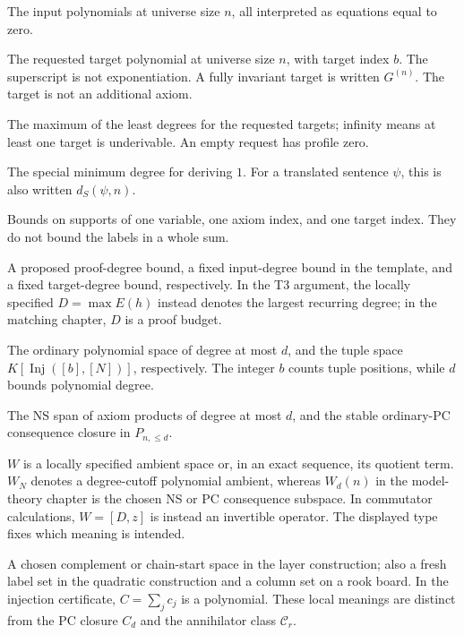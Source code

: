 \documentclass[11pt,a4paper,oneside,openany]{book}
\theoremstyle{definition}\newtheorem{definition}[theorem]{Definition}
\theoremstyle{remark}\newtheorem{remark}[theorem]{Remark}
\DeclareMathOperator{\Inj}{Inj}
\numberwithin{equation}{chapter}
\begin{document}
\begin{description}[style=nextline,leftmargin=1em,labelindent=0pt,labelwidth=0pt]
\item[$\Gamma_n$] The input polynomials at universe size $n$, all
interpreted as equations equal to zero.
\item[$G_b^{(n)}$] The requested target polynomial at universe size $n$,
with target index $b$. The superscript is not exponentiation. A fully
invariant target is written $G^{(n)}$. The target is not an additional axiom.
\item[$h_S(n)$] The maximum of the least degrees for the requested
targets; infinity means at least one target is underivable. An empty
request has profile zero.
\item[$d_S(\Gamma_n)$] The special minimum degree for deriving $1$.
For a translated sentence $\psi$, this is also written $d_S(\psi,n)$.
\item[$k,s,t$] Bounds on supports of one variable, one axiom index,
and one target index. They do not bound the labels in a whole sum.
\item[$d,D,D_G$] A proposed proof-degree bound, a fixed input-degree
bound in the template, and a fixed target-degree bound, respectively.
In the T3 argument, the locally specified $D=\max E(h)$ instead denotes
the largest recurring degree; in the matching chapter, $D$ is a proof budget.
\item[$P_{n,\le d},P_b(N)$] The ordinary polynomial space of degree at
most $d$, and the tuple space $K[\Inj([b],[N])]$, respectively.
The integer $b$ counts tuple positions, while $d$ bounds polynomial degree.
\item[$I_d,C_d$] The NS span of axiom products of degree at most $d$,
and the stable ordinary-PC consequence closure in $P_{n,\le d}$.
\item[$W,W_N,W_d(n)$] $W$ is a locally specified ambient space or,
in an exact sequence, its quotient term. $W_N$ denotes a degree-cutoff
polynomial ambient, whereas $W_d(n)$ in the model-theory chapter is
the chosen NS or PC consequence subspace. In commutator calculations,
$W=[D,z]$ is instead an invertible operator. The displayed type fixes
which meaning is intended.
\item[$C$] A chosen complement or chain-start space in the layer
construction; also a fresh label set in the quadratic construction
and a column set on a rook board. In the injection certificate,
$C=\sum_j c_j$ is a polynomial. These local meanings are distinct
from the PC closure $C_d$ and the annihilator class $\mathcal C_r$.

\end{description}
\end{document}
